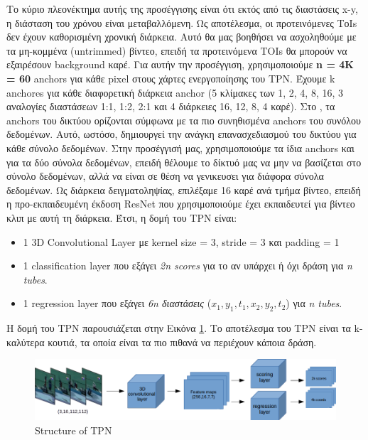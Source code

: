 \documentclass{report}
\begin{document}
Το κύριο πλεονέκτημα αυτής της προσέγγισης είναι ότι εκτός από τις διαστάσεις x-y, η διάσταση του χρόνου είναι μεταβαλλόμενη. Ως αποτέλεσμα, οι προτεινόμενες ΤοΙs
δεν έχουν καθορισμένη χρονική διάρκεια. Αυτό θα μας βοηθήσει να ασχοληθούμε με τα μη-κομμένα (untrimmed) βίντεο, επειδή τα προτεινόμενα TOIs θα μπορούν να εξαιρέσουν background καρέ.
Για αυτήν την προσέγγιση, χρησιμοποιούμε \textbf{n = 4K = 60} anchors για κάθε pixel στους χάρτες ενεργοποίησης του TPN. Έχουμε k anchores για κάθε διαφορετική διάρκεια anchor
 (5 κλίμακες των 1, 2, 4, 8, 16, 3 αναλογίες διαστάσεων 1:1, 1:2, 2:1 και 4 διάρκειες 16, 12, 8, 4 καρέ).
Στο \cite{DBLP:journals/corr/HouCS17}, τα anchors του δικτύου ορίζονται σύμφωνα με τα πιο συνηθισμένα anchors του συνόλου δεδομένων. Αυτό, ωστόσο,
δημιουργεί την ανάγκη επανασχεδιασμού του δικτύου για κάθε σύνολο δεδομένων. Στην προσέγγισή μας, χρησιμοποιούμε τα ίδια anchors και για τα δύο σύνολα δεδομένων, επειδή θέλουμε το δίκτυό μας να μην
να βασίζεται στο σύνολο δεδομένων, αλλά να είναι σε θέση να γενικευσει για διάφορα σύνολα δεδομένων. Ως διάρκεια δειγματοληψίας, επιλέξαμε 16 καρέ ανά τμήμα βίντεο, επειδή
η προ-εκπαιδευμένη έκδοση ResNet που χρησιμοποιούμε έχει εκπαιδευτεί για βίντεο κλιπ με αυτή τη διάρκεια.
Έτσι, η δομή του TPN είναι:
\begin{itemize}
\item 1 3D Convolutional Layer με kernel size = 3, stride = 3 και padding = 1
\item 1 classification layer που εξάγει \textit{2n scores} για το αν υπάρχει ή όχι δράση για \textit{n tubes}.
\item 1 regression layer που εξάγει \textit{6n διαστάσεις} ($x_1,y_1,t_1,x_2,y_2,t_2$) για \textit{n tubes}.
\end{itemize}

Η δομή του TPN παρουσιάζεται στην Εικόνα \ref{fig:tpn_1_1}. Το αποτέλεσμα του TPN είναι τα k-καλύτερα κουτιά, τα οποία
είναι τα πιο πιθανά να περιέχουν κάποια δράση.
\begin{figure}[h]
  \includegraphics[width=1.\textwidth]{tpn_1_1}
  \caption{Structure of TPN}
  \label{fig:tpn_1_1}
\end{figure}
\end{document}
